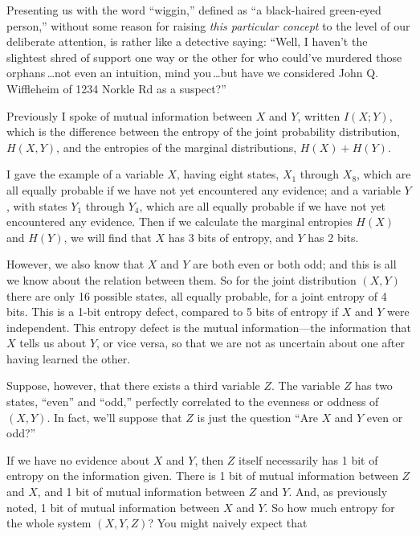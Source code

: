 {{{
 Presenting us with the word
``wiggin,'' defined as
``a black-haired green-eyed
person,'' without some reason for raising
\textit{this particular concept} to the level of our deliberate
attention, is rather like a detective saying: ``Well,
I haven't the slightest shred of support one way or the
other for who could've murdered those orphans\,\ldots not
even an intuition, mind you\,\ldots but have we considered John Q.
Wiffleheim of 1234 Norkle Rd as a suspect?''}

\myendsectiontext


\bigskip


{
 Previously I spoke of mutual information between $X$ and $Y$, written
$I(X;Y)$, which is the difference between the entropy of the joint
probability distribution, $H(X,Y)$, and the entropies of the marginal
distributions, $H(X) + H(Y)$. }

{
 I gave the example of a variable $X$, having eight states,
$X_{1}$ through $X_{8}$, which are all equally
probable if we have not yet encountered any evidence; and a variable $Y$,
with states $Y_{1}$ through $Y_{4}$, which are
all equally probable if we have not yet encountered any evidence. Then
if we calculate the marginal entropies $H(X)$ and $H(Y)$, we will find that
$X$ has 3 bits of entropy, and $Y$ has 2 bits.}

{
 However, we also know that $X$ and $Y$ are both even or both odd; and
this is all we know about the relation between them. So for the joint
distribution $(X,Y)$ there are only 16 possible states, all equally
probable, for a joint entropy of 4 bits. This is a 1-bit entropy
defect, compared to 5 bits of entropy if $X$ and $Y$ were independent. This
entropy defect is the mutual information---the information that $X$ tells
us about $Y$, or vice versa, so that we are not as uncertain about one
after having learned the other.}

{
 Suppose, however, that there exists a third variable $Z$. The
variable $Z$ has two states, ``even''
and ``odd,'' perfectly correlated to
the evenness or oddness of $(X,Y)$. In fact, we'll
suppose that $Z$ is just the question ``Are $X$ and $Y$ even
or odd?''}

{
 If we have no evidence about $X$ and $Y$, then $Z$ itself necessarily
has 1 bit of entropy on the information given. There is 1 bit of mutual
information between $Z$ and $X$, and 1 bit of mutual information between $Z$
and $Y$. And, as previously noted, 1 bit of mutual information between $X$
and $Y$. So how much entropy for the whole system $(X,Y,Z)$? You might
naively expect that}

}}
